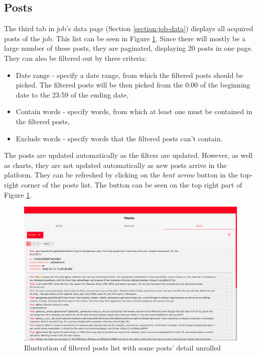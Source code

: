 \documentclass{article}
\begin{document}
\subsection{Posts}\label{section:job-posts}
The third tab in job's data page (Section \ref{section:job-data}) displays all acquired posts of the job. This list can be seen in Figure \ref{figure:posts-list}. Since there will mostly be a large number of these posts, they are paginated, displaying 20 posts in one page. They can also be filtered out by three criteria:
\begin{itemize}
    \item Date range - specify a date range, from which the filtered posts should be picked. The filtered posts will be then picked from the 0:00 of the beginning date to the 23:59 of the ending date,
    \item Contain words - specify words, from which at least one must be contained in the filtered posts,
    \item Exclude words - specify words that the filtered posts can't contain.
\end{itemize}

The posts are updated automatically as the filters are updated. However, as well as charts, they are not updated automatically as new posts arrive in the platform. They can be refreshed by clicking on the \textit{bent arrow} button in the top-right corner of the posts list. The button can be seen on the top right part of Figure \ref{figure:posts-list}.

\begin{figure}[h]
\includegraphics[width=\textwidth]{images/posts_list.png}
\centering
\caption{Illustration of filtered posts list with some posts' detail unrolled}
\label{figure:posts-list}
\end{figure}
\end{document}
